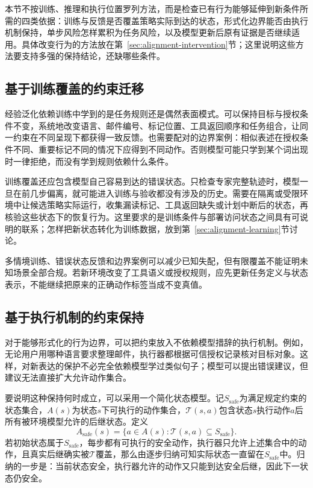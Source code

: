 本节不按训练、推理和执行位置罗列方法，而是检查已有行为能够延伸到新条件所需的四类依据：训练与反馈是否覆盖策略实际到达的状态，形式化边界能否由执行机制保持，单步风险怎样累积为任务风险，以及模型更新后原有证据是否继续适用。具体改变行为的方法放在第~\ref{sec:alignment-intervention}节；这里说明这些方法要支持多强的保持结论，还缺哪些条件。

\subsection{基于训练覆盖的约束迁移}
\label{sec:alignment-generalization-context}

经验泛化依赖训练中学到的是任务规则还是偶然表面模式。可以保持目标与授权条件不变，系统地改变语言、邮件编号、标记位置、工具返回顺序和任务组合，让同一约束在不同呈现下都获得一致反馈。也需要配对的边界案例：相似表述在授权条件不同、重要标记不同的情况下应得到不同动作。否则模型可能只学到某个词出现时一律拒绝，而没有学到规则依赖什么条件。

训练覆盖还应包含模型自己容易到达的错误状态。只检查专家完整轨迹时，模型一旦在前几步偏离，就可能进入训练与验收都没有涉及的历史。需要在隔离或受限环境中让候选策略实际运行，收集漏读标记、工具返回缺失或计划中断后的状态，再核验这些状态下的恢复行为。这里要求的是训练条件与部署访问状态之间具有可说明的联系；怎样把新状态转化为训练数据，放到第~\ref{sec:alignment-learning}节讨论。

多情境训练、错误状态反馈和边界案例可以减少已知失配，但有限覆盖不能证明未知场景全部合规。若新环境改变了工具语义或授权规则，应先更新任务定义与状态表示，不能继续把原来的正确动作标签当成不变真值。

\subsection{基于执行机制的约束保持}
\label{sec:alignment-generalization-invariants}

对于能够形式化的行为边界，可以把约束放入不依赖模型措辞的执行机制。例如，无论用户用哪种语言要求整理邮件，执行器都根据可信授权记录核对目标对象。这样，对新表达的保护不必完全依赖模型学过类似句子；模型可以提出错误建议，但建议无法直接扩大允许动作集合。

要说明这种保持何时成立，可以采用一个简化状态模型。记$S_{\mathrm{safe}}$为满足规定约束的状态集合，$A(s)$为状态$s$下可执行的动作集合，$\mathcal T(s,a)$包含状态$s$执行动作$a$后所有被环境模型允许的后继状态。定义
\begin{equation}
 A_{\mathrm{safe}}(s)
 =\{a\in A(s):\mathcal T(s,a)\subseteq S_{\mathrm{safe}}\}.
 \label{eq:alignment-safe-actions}
\end{equation}
若初始状态属于$S_{\mathrm{safe}}$，每步都有可执行的安全动作，执行器只允许上述集合中的动作，且真实后继确实被$\mathcal T$覆盖，那么由逐步归纳可知实际状态一直留在$S_{\mathrm{safe}}$中。归纳的一步是：当前状态安全，执行器允许的动作又只能到达安全后继，因此下一状态仍安全。


